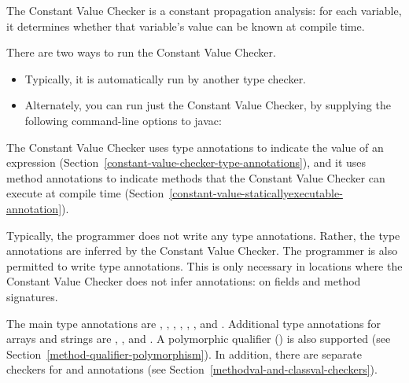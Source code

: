\htmlhr
{}

The Constant Value Checker is a constant propagation analysis: for
each variable, it determines whether that variable's value can be
known at compile time.

There are two ways to run the Constant Value Checker.
\begin{itemize}
\item
Typically, it is automatically run by another type checker.
\item
Alternately, you can run just the Constant Value Checker, by
supplying the following command-line options to javac:
\end{itemize}



The Constant Value Checker uses type annotations to indicate the value of
an expression (Section~\ref{constant-value-checker-type-annotations}), and
it uses method annotations to indicate methods that the Constant Value
Checker can execute at compile time
(Section~\ref{constant-value-staticallyexecutable-annotation}).



Typically, the programmer does not write any type annotations.  Rather, the
type annotations are inferred by the Constant Value Checker.
The programmer is also permitted to write type annotations.  This is only necessary in
locations where the Constant Value Checker does not infer annotations:  on fields
and method signatures.

The main type annotations are
,
,
,
,
,
,
and .
Additional type annotations for arrays and strings are
,
,
and .
A polymorphic qualifier ()
is also supported (see Section~\ref{method-qualifier-polymorphism}).
In addition, there are separate checkers for
 and
 annotations
(see Section~\ref{methodval-and-classval-checkers}).

